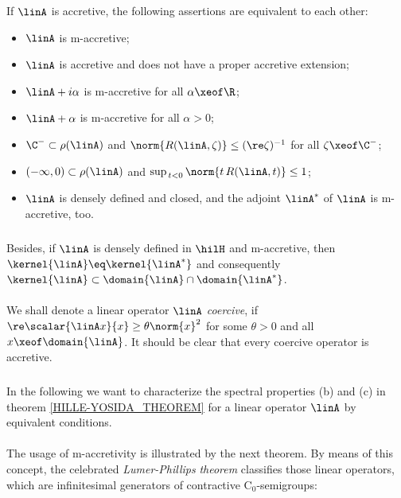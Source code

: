 \documentclass[11pt,twoside]{article}
\begin{document}
\begin{theorem1}
If $\linA$ is accretive,
the following assertions are equivalent to each other:

\begin{itemize}[leftmargin=17pt]
\item[(a)]
$\linA$ is m-accretive;

\item[(b)]
$\linA$ is accretive and does not have a proper accretive extension;

\item[(c)]
$\linA + i\alpha$ is m-accretive for all $\alpha \xeof \R$;

\item[(d)]
$\linA + \alpha$ is m-accretive for all $\alpha > 0$;

\item[(e)]
$\C^- \subset \rho(\linA)$ and $\norm{R(\linA,\zeta)} \leq (\re \zeta)^{-1}$
for all $\zeta \xeof \C^-$;

\item[(f)]
$(-\infty,0) \subset \rho(\linA)$ and
$\sup_{\,t<0} \norm{t\,R(\linA,t)} \leq 1$;

\item[(g)]
$\linA$ is densely defined and closed,
and the adjoint $\linA^*$ of $\linA$ is m-accretive,
too.
\end{itemize}
\end{theorem1}

\subparagraph{} %
Besides,
if $\linA$ is densely defined in $\hilH$ and m-accretive,
then $\kernel{\linA} \eq \kernel{\linA^*}$ and consequently
$\kernel{\linA} \subset \domain{\linA} \cap \domain{\linA^*}$.

\paragraph{} %
We shall denote a linear operator $\linA$ \textit{coercive},
if $\re \scalar{\linA x}{x} \geq \theta \norm{x}^2$
for some $\theta > 0$ and all $x \xeof \domain{\linA}$.
It should be clear that
every coercive operator is accretive.

\subparagraph{}
In the following we want to characterize the spectral properties (b) and (c)
in theorem \ref{HILLE-YOSIDA_THEOREM}
for a linear operator $\linA$ by equivalent conditions.

\paragraph{} %
The usage of m-accretivity is illustrated by the next theorem.
By means of this concept,
the celebrated \textit{Lumer-Phillips} \textit{theorem}
classifies those linear operators,
which are infinitesimal generators of contractive C$_0$-semigroups:
\end{document}
